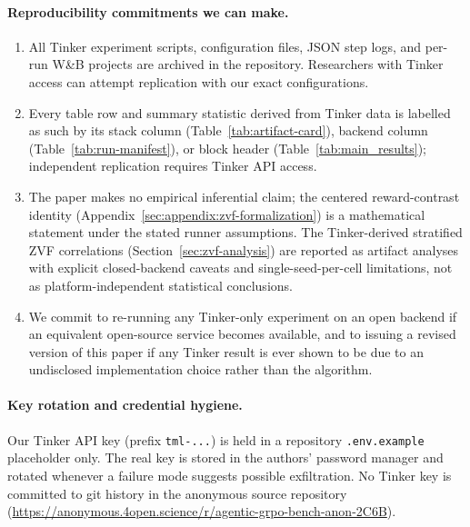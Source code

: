 \paragraph{Reproducibility commitments we can make.}
\begin{enumerate}
  \item All Tinker experiment scripts, configuration files, JSON step
        logs, and per-run W\&B projects are archived in the repository.
        Researchers with Tinker access can attempt replication with our
        exact configurations.
  \item Every table row and summary statistic derived from Tinker data is
        labelled as such by its stack column (Table~\ref{tab:artifact-card}),
        backend column (Table~\ref{tab:run-manifest}), or block header
        (Table~\ref{tab:main_results}); independent replication requires
        Tinker API access.
  \item The paper makes no empirical inferential claim; the centered
        reward-contrast identity (Appendix~\ref{sec:appendix:zvf-formalization})
        is a mathematical statement under the stated runner assumptions.
        The Tinker-derived stratified ZVF
        correlations (Section~\ref{sec:zvf-analysis}) are reported as
        artifact analyses with explicit closed-backend caveats and
        single-seed-per-cell limitations, not as platform-independent
        statistical conclusions.
  \item We commit to re-running any Tinker-only experiment on an open
        backend if an equivalent open-source service becomes available,
        and to issuing a revised version of this paper if any Tinker
        result is ever shown to be due to an undisclosed
        implementation choice rather than the algorithm.
\end{enumerate}

\paragraph{Key rotation and credential hygiene.}
Our Tinker API key (prefix \texttt{tml-...}) is held in a repository
\texttt{.env.example} placeholder only. The real key is stored in the
authors' password manager and rotated whenever a failure mode suggests
possible exfiltration. No Tinker key is committed to git history in the
anonymous source repository
(\url{https://anonymous.4open.science/r/agentic-grpo-bench-anon-2C6B}).

